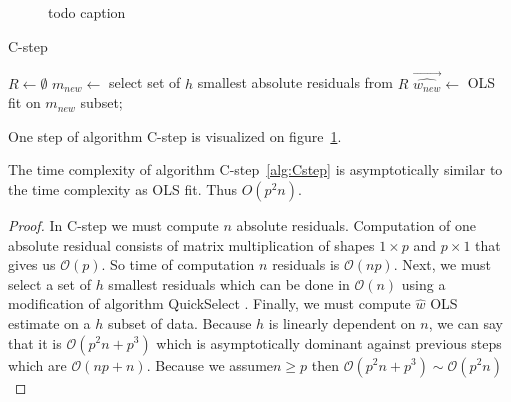 \begin{figure}[h]
\centering
{}
\caption{todo caption}
\label{figure:one:c:step}
\end{figure}

\begin{algorithm}[H]
    \label{alg:Cstep}
    \caption{C-step}
    
    $R \gets \emptyset$\;
    $m_{new} \gets $ select set of $h$ smallest absolute residuals from $R$\;
    $\vec{\hat{w_{new}}} \gets$ OLS fit on $m_{new}$ subset;
    \;
\end{algorithm}

One step of algorithm C-step is visualized on figure~\ref{figure:one:c:step}.



\begin{observation} \label{csteptimecomplexity}
    The time complexity of algorithm C-step~\ref{alg:Cstep} is asymptotically similar to the time complexity as OLS fit. Thus $O(p^2n)$.
\end{observation} 

\begin{proof}
    In C-step we must compute $n$ absolute residuals. Computation of one absolute residual consists of
    matrix multiplication of shapes $1 \times p$ and $p \times 1$ that gives us $\mathcal{O}(p)$. So time of computation $n$ residuals is $\mathcal{O}(np)$.
    Next, we must select a set of $h$ smallest residuals which can be done in $\mathcal{O}(n)$ using a modification of algorithm QuickSelect \cite{hoare1961algorithm}.
    Finally, we must compute $\hat{w}$ OLS estimate on a $h$ subset of data. Because $h$ is linearly dependent on $n$, we can say that it is $\mathcal{O}(p^2n + p^3)$ which is asymptotically dominant against previous steps which are $\mathcal{O}(np + n)$. Because we assume$n \ge p$ then $\mathcal{O}(p^2n + p^3) \sim \mathcal{O}(p^2n) $
\end{proof}

